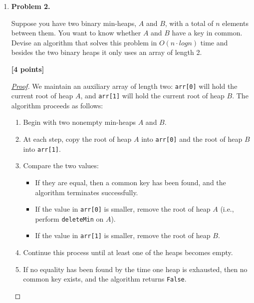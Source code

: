 \documentclass[11pt]{article}
\begin{document}
\begin{enumerate}
\begin{proof}[\underline{Proof}]
Using the bound \(\log(n!) < n \log n\), we obtain
\[
T(n) < n \log n + 2n - 1 \;\in\; O(n \log n).
\]

\underline{Conclusion.} The cost of \texttt{build} in the online case is \(O(n \cdot log n)\) even with the cost of copying taken into account.

\end{proof}


\item \textbf{Problem 2.}

Suppose you have two binary min-heaps, \(A\) and \(B\), with a total of \(n\) elements between them. You want to know whether \(A\) and \(B\) have a key in common. Devise an algorithm that solves this problem in \(O(n \cdot log n)\) time and besides the two binary heaps it only uses an array of length 2.

\begin{flushright}
\end{flushright}

\begin{flushright}
\textbf{[4 points]}
\end{flushright}

\begin{proof}[\underline{Proof}]

We maintain an auxiliary array of length two: \texttt{arr[0]} will hold the current root of heap \(A\), and \texttt{arr[1]} will hold the current root of heap \(B\).  
The algorithm proceeds as follows:

\begin{enumerate}[label=\arabic*.]
    \item Begin with two nonempty min-heaps \(A\) and \(B\).
    \item At each step, copy the root of heap \(A\) into \texttt{arr[0]} and the root of heap \(B\) into \texttt{arr[1]}.
    \item Compare the two values:
    \begin{itemize}
        \item If they are equal, then a common key has been found, and the algorithm terminates successfully.
        \item If the value in \texttt{arr[0]} is smaller, remove the root of heap \(A\) (i.e., perform \texttt{deleteMin} on \(A\)).
        \item If the value in \texttt{arr[1]} is smaller, remove the root of heap \(B\).
    \end{itemize}
    \item Continue this process until at least one of the heaps becomes empty.
    \item If no equality has been found by the time one heap is exhausted, then no common key exists, and the algorithm returns \texttt{False}.
\end{enumerate}


\end{proof}
\end{enumerate}
\end{document}
